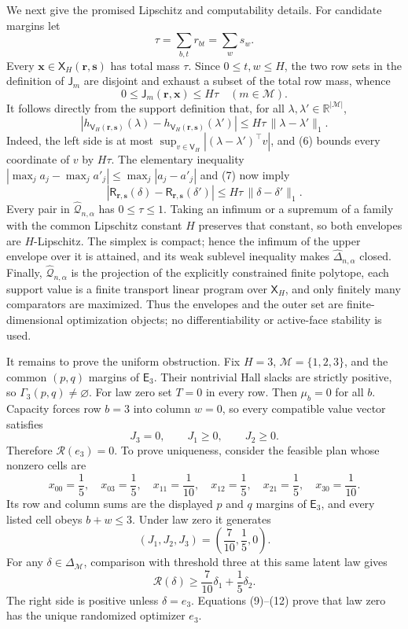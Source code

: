 We next give the promised Lipschitz and computability details.  For candidate margins let
\[
 \tau=\sum_{b,t}r_{bt}=\sum_ws_w.
\]
Every \(\mathbf x\in\mathsf X_H(\mathbf r,\mathbf s)\) has total mass \(\tau\).  Since \(0\le t,w\le H\), the two row sets in the definition of \(\mathsf J_m\) are disjoint and exhaust a subset of the total row mass, whence
\[
 0\le \mathsf J_m(\mathbf r,\mathbf x)\le H\tau
 \quad(m\in\mathcal M).                                 \tag{6}
\]
It follows directly from the support definition that, for all \(\lambda,\lambda'\in\mathbb R^{|\mathcal M|}\),
\[
 \left|h_{\mathsf V_H(\mathbf r,\mathbf s)}(\lambda)
       -h_{\mathsf V_H(\mathbf r,\mathbf s)}(\lambda')\right|
 \le H\tau\,\|\lambda-\lambda'\|_1.                    \tag{7}
\]
Indeed, the left side is at most \(\sup_{v\in\mathsf V_H}|(\lambda-\lambda')^\top v|\), and (6) bounds every coordinate of \(v\) by \(H\tau\).  The elementary inequality \(|\max_j a_j-\max_j a'_j|\le\max_j|a_j-a'_j|\) and (7) now imply
\[
 |\mathsf R_{\mathbf r,\mathbf s}(\delta)
   -\mathsf R_{\mathbf r,\mathbf s}(\delta')|
 \le H\tau\,\|\delta-\delta'\|_1.                      \tag{8}
\]
Every pair in \(\widehat{\mathcal Q}_{n,\alpha}\) has \(0\le\tau\le1\).  Taking an infimum or a supremum of a family with the common Lipschitz constant \(H\) preserves that constant, so both envelopes are \(H\)-Lipschitz.  The simplex is compact; hence the infimum of the upper envelope over it is attained, and its weak sublevel inequality makes \(\widehat\Delta_{n,\alpha}\) closed.  Finally, \(\widehat{\mathcal Q}_{n,\alpha}\) is the projection of the explicitly constrained finite polytope, each support value is a finite transport linear program over \(\mathsf X_H\), and only finitely many comparators are maximized.  Thus the envelopes and the outer set are finite-dimensional optimization objects; no differentiability or active-face stability is used.

It remains to prove the uniform obstruction.  Fix \(H=3\), \(\mathcal M=\{1,2,3\}\), and the common \((p,q)\) margins of \(\mathsf E_3\).  Their nontrivial Hall slacks are strictly positive, so \(\Gamma_3(p,q)\ne\varnothing\).  For law zero set \(T=0\) in every row.  Then \(\mu_b=0\) for all \(b\).  Capacity forces row \(b=3\) into column \(w=0\), so every compatible value vector satisfies
\[
 J_3=0,
 \qquad J_1\ge0,
 \qquad J_2\ge0.                                        \tag{9}
\]
Therefore \(\mathcal R(e_3)=0\).  To prove uniqueness, consider the feasible plan whose nonzero cells are
\[
 x_{00}=\frac15,\quad x_{03}=\frac15,\quad
 x_{11}=\frac1{10},\quad x_{12}=\frac15,\quad
 x_{21}=\frac15,\quad x_{30}=\frac1{10}.                 \tag{10}
\]
Its row and column sums are the displayed \(p\) and \(q\) margins of \(\mathsf E_3\), and every listed cell obeys \(b+w\le3\).  Under law zero it generates
\[
 (J_1,J_2,J_3)=\left(\frac7{10},\frac15,0\right).        \tag{11}
\]
For any \(\delta\in\Delta_{\mathcal M}\), comparison with threshold three at this same latent law gives
\[
 \mathcal R(\delta)
 \ge \frac7{10}\delta_1+\frac15\delta_2.                \tag{12}
\]
The right side is positive unless \(\delta=e_3\).  Equations (9)--(12) prove that law zero has the unique randomized optimizer \(e_3\).

